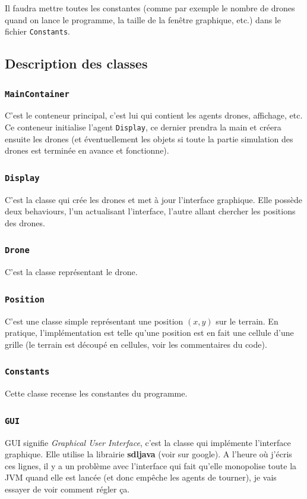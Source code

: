 \documentclass[11pt]{report}
\begin{document}
Il faudra mettre toutes les constantes (comme par exemple le nombre de drones quand on lance le programme,  la taille de la fenêtre graphique, etc.) dans le fichier \verb|Constants|.

\newpage
\subsection{Description des classes}
\subsubsection{\protect\Verb+MainContainer+}

C'est le conteneur principal, c'est lui qui contient les agents drones, affichage, etc. Ce conteneur initialise l'agent \verb|Display|, ce dernier prendra la main et créera ensuite les drones (et éventuellement les objets si toute la partie simulation des drones est terminée en avance et fonctionne).

\subsubsection{\protect\Verb+Display+}

C'est la classe qui crée les drones et met à jour l'interface graphique. Elle possède deux behaviours, l'un actualisant l'interface, l'autre allant chercher les positions des drones.

\subsubsection{\protect\Verb+Drone+}

C'est la classe représentant le drone.

\subsubsection{\protect\Verb+Position+}

C'est une classe simple représentant une position $(x, y)$ sur le terrain. En pratique, l'implémentation est telle qu'une position est en fait une cellule d'une grille (le terrain est découpé en cellules, voir les commentaires du code).

\subsubsection{\protect\Verb+Constants+}

Cette classe recense les constantes du programme.

\subsubsection{\protect\Verb+GUI+}

GUI signifie \textit{Graphical User Interface}, c'est la classe qui implémente l'interface graphique. Elle utilise la librairie \textbf{sdljava} (voir sur google). A l'heure où j'écris ces lignes, il y a un problème avec l'interface qui fait qu'elle monopolise toute la JVM quand elle est lancée (et donc empêche les agents de tourner), je vais essayer de voir comment régler ça.
\end{document}
